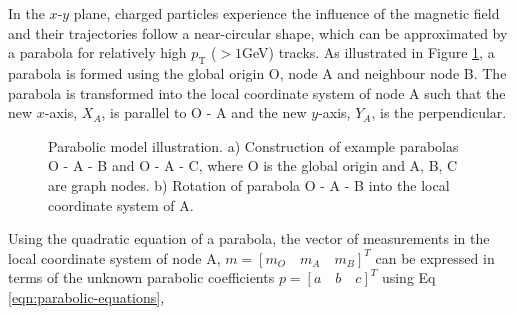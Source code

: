 In the $x$-$y$ plane, charged particles experience the influence of the magnetic field and their trajectories follow a near-circular shape, which can be approximated by a parabola for relatively high $p_{\text{T}}$ ($> 1$GeV) tracks. As illustrated in Figure \ref{fig:gnn-parabolic-model}, a parabola is formed using the global origin O, node A and neighbour node B. The parabola is transformed into the local coordinate system of node A such that the new $x$-axis, $X_A$, is parallel to O - A and the new $y$-axis, $Y_A$, is the perpendicular. 

\begin{figure}[htbp!] 
    \centering
    \hfill%
    \caption{Parabolic model illustration. a) Construction of example parabolas O - A - B and O - A - C, where O is the global origin and A, B, C are graph nodes. b) Rotation of parabola O - A - B into the local coordinate system of A.}
    \label{fig:gnn-parabolic-model}
\end{figure}


Using the quadratic equation of a parabola, the vector of measurements in the local coordinate system of node A, $ m = [m_O \quad m_A \quad m_B]^{T}$ can be expressed in terms of the unknown parabolic coefficients $p = [a \quad b \quad c]^{T}$ using Eq \eqref{eqn:parabolic-equations}, 


